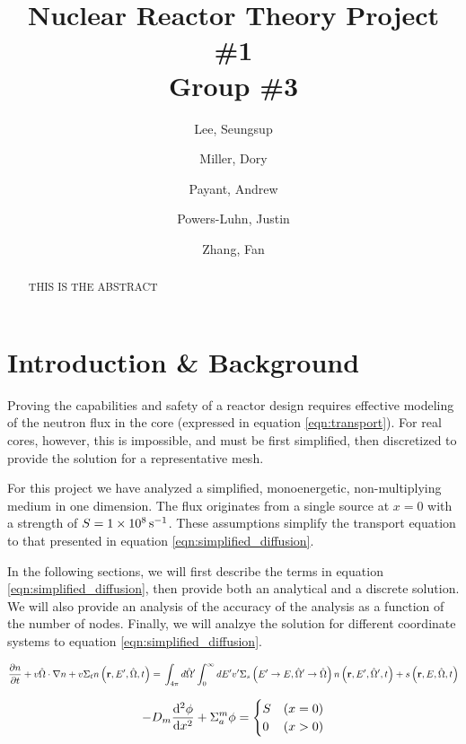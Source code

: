 \documentclass[10pt,peerreviewca]{IEEEtran} %
\author{
	Lee, Seungsup
	\and
	Miller, Dory
	\and
	Payant, Andrew
	\and
	Powers-Luhn, Justin
	\and
	Zhang, Fan
}
\title{Nuclear Reactor Theory Project \#1\\Group \#3}
\begin{document}
	\maketitle
	\newpage

	\begin{abstract}
		THIS IS THE ABSTRACT
	\end{abstract}
	
	\section{Introduction \& Background}
	Proving the capabilities and safety of a reactor design requires effective modeling of the neutron flux in the core (expressed in equation \ref{eqn:transport}). For real cores, however, this is impossible, and must be first simplified, then discretized to provide the solution for a representative mesh. 

	For this project we have analyzed a simplified, monoenergetic, non-multiplying medium in one dimension. The flux originates from a single source at $x=0$ with a strength of $S=\SI{1E8}{\per\second}$. These assumptions simplify the transport equation to that presented in equation \ref{eqn:simplified_diffusion}.

	In the following sections, we will first describe the terms in equation \ref{eqn:simplified_diffusion}, then provide both an analytical and a discrete solution. We will also provide an analysis of the accuracy of the analysis as a function of the number of nodes. Finally, we will analzye the solution for different coordinate systems to equation \ref{eqn:simplified_diffusion}.

	\begin{equation}
		\pdv{n}{t} + v \hat{\Omega} \cdot \nabla n + v \Sigma_t n \left( \mathbf{r}, E^\prime, \hat{\Omega}, t \right) = \\ \int_{4\pi} d \hat{\Omega} ^\prime \int_0^{\infty} dE ^\prime v^\prime \Sigma_s\left( E ^\prime \rightarrow E, \hat{\Omega} ^\prime \rightarrow \hat{\Omega} \right) n\left( \mathbf{r}, E ^\prime, \hat{\Omega} ^\prime, t \right) + s\left( \mathbf{r}, E, \hat{\Omega}, t \right)
		\label{eqn:transport}
	\end{equation}

	\begin{equation}
		-D_m \dv[2]{\phi}{x} + \Sigma^m_a \phi = 
		\begin{cases}
			S & \left(x=0\right) \\
			0 & \left(x>0\right)
		\end{cases}
		\label{eqn:simplified_diffusion}
	\end{equation}
\end{document}
